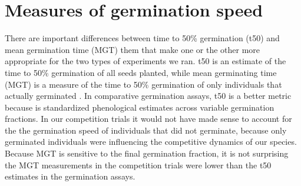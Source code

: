 \documentclass{article}
\begin{document}
\pagebreak
\section*{Measures of germination speed}
There are important differences between time to 50\% germination (t50) and mean germination time (MGT) them that make one or the other more appropriate for the two types of experiments we ran. t50 is an estimate of the time to 50\% germination of all seeds planted, while mean germinating time (MGT) is a measure of the time to 50\% germination of only individuals that actually germinated \citep{Soltani:2015aa}. In comparative germination assays, t50 is a better metric because is standardized phenological estimates across variable germination fractions. In our competition trials it would not have made sense to account for the the germination speed of individuals that did not germinate, because only germinated individuals were influencing the competitive dynamics of our species. Because MGT is sensitive to the final germination fraction, it is not surprising the MGT measurements in the competition trials  were lower than the t50 estimates in the germination assays.


\end{document}
